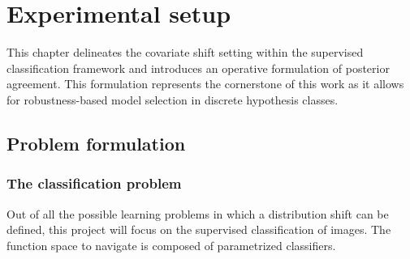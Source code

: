 \chapter{Experimental setup}\label{sec:experimental_setup}

This chapter delineates the covariate shift setting within the 
supervised classification framework and introduces an operative
formulation of posterior agreement. This formulation represents 
the cornerstone of this work as it allows for robustness-based
model selection in discrete hypothesis classes.

\section{Problem formulation}

\subsection{The classification problem}

Out of all the possible learning problems in which a distribution shift
can be defined, this project will focus on the supervised classification
of images. The function space to navigate is composed of parametrized
classifiers.

